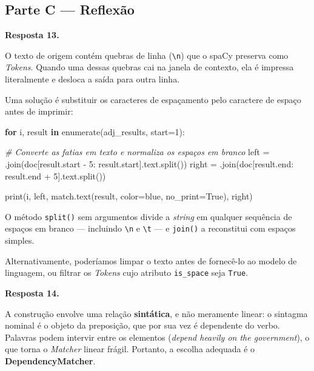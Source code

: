 \documentclass[
  brazilian,
]{article}
\newenvironment{Shaded}{}{}
\newcommand{\BuiltInTok}[1]{#1}
\newcommand{\CommentTok}[1]{\textcolor[rgb]{0.38,0.63,0.69}{\textit{#1}}}
\newcommand{\ControlFlowTok}[1]{\textcolor[rgb]{0.00,0.44,0.13}{\textbf{#1}}}
\newcommand{\DecValTok}[1]{\textcolor[rgb]{0.25,0.63,0.44}{#1}}
\newcommand{\KeywordTok}[1]{\textcolor[rgb]{0.00,0.44,0.13}{\textbf{#1}}}
\newcommand{\NormalTok}[1]{#1}
\newcommand{\OperatorTok}[1]{\textcolor[rgb]{0.40,0.40,0.40}{#1}}
\newcommand{\StringTok}[1]{\textcolor[rgb]{0.25,0.44,0.63}{#1}}
\newcommand{\VariableTok}[1]{\textcolor[rgb]{0.10,0.09,0.49}{#1}}
\begin{document}
\hypertarget{parte-c-reflexuxe3o}{%
\subsection{Parte C --- Reflexão}\label{parte-c-reflexuxe3o}}

\textbf{Resposta 13.}

O texto de origem contém quebras de linha (\texttt{\textbackslash{}n})
que o spaCy preserva como \emph{Tokens}. Quando uma dessas quebras cai
na janela de contexto, ela é impressa literalmente e desloca a saída
para outra linha.

Uma solução é substituir os caracteres de espaçamento pelo caractere de
espaço antes de imprimir:

\begin{Shaded}
\begin{Highlighting}[]
\ControlFlowTok{for}\NormalTok{ i, result }\KeywordTok{in} \BuiltInTok{enumerate}\NormalTok{(adj\_results, start}\OperatorTok{=}\DecValTok{1}\NormalTok{):}

    \CommentTok{\# Converte as fatias em texto e normaliza os espaços em branco}
\NormalTok{    left }\OperatorTok{=} \StringTok{\textquotesingle{} \textquotesingle{}}\NormalTok{.join(doc[result.start }\OperatorTok{{-}} \DecValTok{5}\NormalTok{: result.start].text.split())}
\NormalTok{    right }\OperatorTok{=} \StringTok{\textquotesingle{} \textquotesingle{}}\NormalTok{.join(doc[result.end: result.end }\OperatorTok{+} \DecValTok{5}\NormalTok{].text.split())}

    \BuiltInTok{print}\NormalTok{(i, left, match.text(result, color}\OperatorTok{=}\StringTok{\textquotesingle{}blue\textquotesingle{}}\NormalTok{, no\_print}\OperatorTok{=}\VariableTok{True}\NormalTok{), right)}
\end{Highlighting}
\end{Shaded}

O método \texttt{split()} sem argumentos divide a \emph{string} em
qualquer sequência de espaços em branco --- incluindo
\texttt{\textbackslash{}n} e \texttt{\textbackslash{}t} --- e
\texttt{join()} a reconstitui com espaços simples.

Alternativamente, poderíamos limpar o texto antes de fornecê-lo ao
modelo de linguagem, ou filtrar os \emph{Tokens} cujo atributo
\texttt{is\_space} seja \texttt{True}.

\textbf{Resposta 14.}

A construção envolve uma relação \textbf{sintática}, e não meramente
linear: o sintagma nominal é o objeto da preposição, que por sua vez é
dependente do verbo. Palavras podem intervir entre os elementos
(\emph{depend heavily on the government}), o que torna o \emph{Matcher}
linear frágil. Portanto, a escolha adequada é o
\textbf{DependencyMatcher}.
\end{document}
